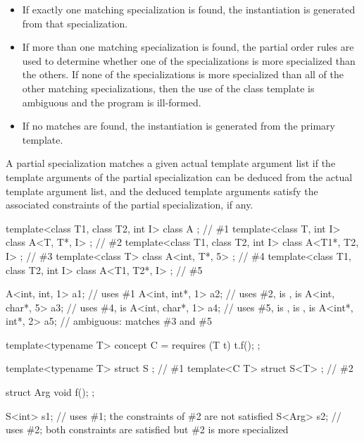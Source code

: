 \begin{itemize}
\item
If exactly one matching specialization is found, the instantiation is
generated from that specialization.
\item
If more than one matching specialization is found,
the partial order rules are used to determine
whether one of the specializations is more specialized than the
others.
If none of the specializations is more specialized than all of the
other matching specializations, then the use of the class template
is ambiguous and the program is ill-formed.
\item
If no matches are found, the instantiation is generated from the
primary template.
\end{itemize}

\pnum
A partial specialization matches a given actual template argument
list if the template arguments of the partial specialization can be
deduced from the actual template argument list,
and the deduced template arguments satisfy the associated constraints
of the partial specialization, if any.
\begin{example}
\begin{codeblock}
template<class T1, class T2, int I> class A             { };    // \#1
template<class T, int I>            class A<T, T*, I>   { };    // \#2
template<class T1, class T2, int I> class A<T1*, T2, I> { };    // \#3
template<class T>                   class A<int, T*, 5> { };    // \#4
template<class T1, class T2, int I> class A<T1, T2*, I> { };    // \#5

A<int, int, 1>   a1;                    // uses \#1
A<int, int*, 1>  a2;                    // uses \#2,  is ,  is 
A<int, char*, 5> a3;                    // uses \#4,  is 
A<int, char*, 1> a4;                    // uses \#5,  is ,  is ,  is 
A<int*, int*, 2> a5;                    // ambiguous: matches \#3 and \#5
\end{codeblock}
\end{example}
\begin{example}
\begin{codeblock}
template<typename T> concept C = requires (T t) { t.f(); };

template<typename T> struct S { };      // \#1
template<C T> struct S<T> { };          // \#2

struct Arg { void f(); };

S<int> s1;                              // uses \#1; the constraints of \#2 are not satisfied
S<Arg> s2;                              // uses \#2; both constraints are satisfied but \#2 is more specialized
\end{codeblock}
\end{example}

